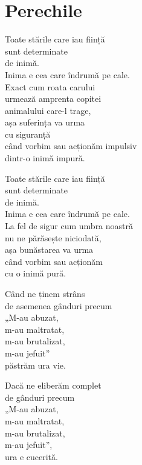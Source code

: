 
\chapter{Perechile}


Toate stările care iau ființă\\
sunt determinate\\
de inimă.\\
Inima e cea care îndrumă pe cale.\\
Exact cum roata carului\\
urmează amprenta copitei\\
animalului care-l trage,\\
așa suferința va urma\\
cu siguranță\\
când vorbim sau acționăm impulsiv\\
dintr-o inimă impură.


Toate stările care iau ființă\\
sunt determinate\\
de inimă.\\
Inima e cea care îndrumă pe cale.\\
La fel de sigur cum umbra noastră\\
nu ne părăsește niciodată,\\
așa bunăstarea va urma\\
când vorbim sau acționăm\\
cu o inimă pură.


Când ne ținem strâns\\
de asemenea gânduri precum\\
„M-au abuzat,\\
m-au maltratat,\\
m-au brutalizat,\\
m-au jefuit”\\
păstrăm ura vie.


Dacă ne eliberăm complet\\
de gânduri precum\\
„M-au abuzat,\\
m-au maltratat,\\
m-au brutalizat,\\
m-au jefuit”,\\
ura e cucerită.


